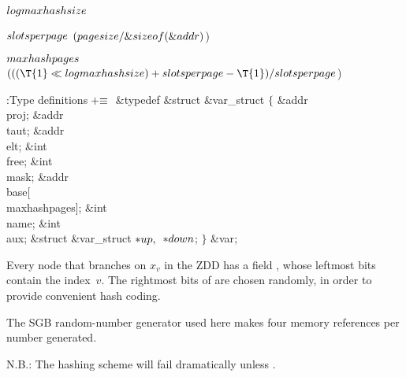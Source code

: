 \Y\B\4\D$\\{logmaxhashsize}$ \5
\par
\B\4\D$\\{slotsperpage}$ \5
$(\\{pagesize}/\&{sizeof}(\&{addr}){}$)\par
\B\4\D$\\{maxhashpages}$ \5
$(((\T{1}\LL\\{logmaxhashsize})+\\{slotsperpage}-\T{1})/\\{slotsperpage}{}$)\par
\Y\B\4:Type definitions\X${}\mathrel+\equiv{}$\6
\&{typedef} \&{struct} \&{var\_struct} ${}\{{}$\1\6
\&{addr} \\{proj};\6
\&{addr} \\{taut};\6
\&{addr} \\{elt};\6
\&{int} \\{free};\6
\&{int} \\{mask};\6
\&{addr} \\{base}[\\{maxhashpages}];\6
\&{int} \\{name};\6
\&{int} \\{aux};\6
\&{struct} \&{var\_struct} ${}{*}\\{up},{}$ ${}{*}\\{down}{}$;\2\6
${}\}{}$ \&{var};\par
\fi

Every node  that branches on $x_v$ in the ZDD has a field ,
whose leftmost  bits contain the index~$v$. The rightmost
 bits of  are chosen
randomly, in order to
provide convenient hash coding.

The SGB random-number generator used here makes four memory references
per number generated.

N.B.: The hashing scheme will fail dramatically unless
.

